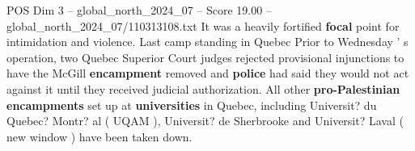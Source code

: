 \begin{textsample}{POS Dim 3 – global\_north\_2024\_07 – Score 19.00 – global\_north\_2024\_07/110313108.txt}
It was a heavily fortified \textbf{focal} point for intimidation and violence.
Last camp standing in Quebec Prior to Wednesday ' s operation, two Quebec Superior Court judges rejected provisional injunctions to have the McGill \textbf{encampment} removed and \textbf{police} had said they would not act against it until they received judicial authorization.
All other \textbf{pro-Palestinian} \textbf{encampments} set up at \textbf{universities} in Quebec, including Universit? du Quebec?
Montr? al ( UQAM ), Universit? de Sherbrooke and Universit?
Laval ( new window ) have been taken down.

\end{textsample}
